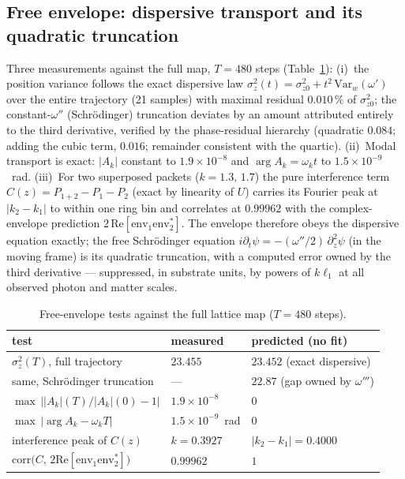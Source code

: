 \documentclass[11pt,a4paper]{article}
\theoremstyle{plain}
\theoremstyle{remark}
\begin{document}
\subsection{Free envelope: dispersive transport and its quadratic truncation}
Three measurements against the full map, $T = 480$ steps (Table~\ref{tab:schr_free}):
(i)~the position variance follows the exact dispersive law $\sigma_z^2(t) = \sigma_{z0}^2 + t^2\,\mathrm{Var}_w(\omega')$ over the entire trajectory (21 samples) with maximal residual $0.010\,\%$ of $\sigma_{z0}^2$; the constant-$\omega''$ (Schr\"odinger) truncation deviates by an amount attributed entirely to the third derivative, verified by the phase-residual hierarchy (quadratic $0.084$; adding the cubic term, $0.016$; remainder consistent with the quartic).
(ii)~Modal transport is exact: $|A_k|$ constant to $1.9\times10^{-8}$ and $\arg A_k = \omega_k t$ to $1.5\times10^{-9}$~rad.
(iii)~For two superposed packets ($k = 1.3,\,1.7$) the pure interference term $C(z) = P_{1+2} - P_1 - P_2$ (exact by linearity of $U$) carries its Fourier peak at $|k_2 - k_1|$ to within one ring bin and correlates at $0.99962$ with the complex-envelope prediction $2\,\mathrm{Re}[\mathrm{env}_1\mathrm{env}_2^*]$.
The envelope therefore obeys the dispersive equation exactly; the free Schr\"odinger equation $i\partial_t\psi = -(\omega''/2)\,\partial_z^2\psi$ (in the moving frame) is its quadratic truncation, with a computed error owned by the third derivative --- suppressed, in substrate units, by powers of $k\ell_1$ at all observed photon and matter scales.

\begin{table}[ht]\centering
\begin{tabular}{lll}
\toprule
test & measured & predicted (no fit) \\
\midrule
$\sigma_z^2(T)$, full trajectory & $23.455$ & $23.452$ \;(exact dispersive) \\
same, Schr\"odinger truncation & --- & $22.87$ \;(gap owned by $\omega'''$) \\
$\max\,\bigl||A_k|(T)/|A_k|(0)-1\bigr|$ & $1.9\times10^{-8}$ & $0$ \\
$\max\,|\arg A_k - \omega_k T|$ & $1.5\times10^{-9}$~rad & $0$ \\
interference peak of $C(z)$ & $k = 0.3927$ & $|k_2 - k_1| = 0.4000$ \\
$\mathrm{corr}\bigl(C,\, 2\mathrm{Re}[\mathrm{env}_1\mathrm{env}_2^*]\bigr)$ & $0.99962$ & $1$ \\
\bottomrule
\end{tabular}
\caption{Free-envelope tests against the full lattice map ($T = 480$ steps).}
\label{tab:schr_free}
\end{table}
\end{document}
